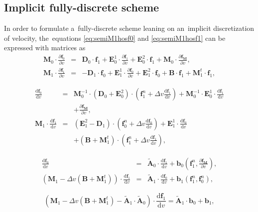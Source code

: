 \documentclass[review]{elsarticle}
\newcommand{\pdv}[2]{\frac{\partial{#1}}{\partial{#2}}}
\newcommand{\vect}[1]{\boldsymbol{#1}}
\newcommand{\matr}[1]{\mathbf{#1}}
\newcommand{\dI}{\text{d}}
\newcommand{\odv}[2]{\frac{\dI #1}{\dI #2}}
\newcommand{\ddv}[2]{\odv{#1}{#2}}
\newcommand{\vmag}{v}
\newcommand{\fM}{f_M}
\newcommand{\vfzero}{\vect{f}_0}
\newcommand{\fone}{\vect{f}_1}
\begin{document}
\subsection{Implicit fully-discrete scheme}\label{sec:impl_fullydiscrete_scheme}
In order to formulate a~fully-discrete scheme leaning on an~implicit 
discretization of velocity, the~equations \eqref{eq:semiM1hosf0} and 
\eqref{eq:semiM1hosf1} can be expressed with matrices as
\begin{eqnarray}
  \matr{M}_0 \cdot \pdv{\vfzero}{\vmag}  
  &=& 
  \matr{D}_0 \cdot \fone
  + \matr{E}_0^1 \cdot \pdv{\fone}{\vmag} + \matr{E}_0^2 \cdot \fone
  + \matr{M}_0 \cdot \pdv{\vect{\fM}}{\vmag} ,  
  \nonumber\\
  \matr{M}_1 \cdot \pdv{\fone}{\vmag}  
  &=& 
  - \matr{D}_1 \cdot \vfzero 
  + \matr{E}_1^1 \cdot \pdv{\vfzero}{\vmag}
  + \matr{E}_1^2 \cdot \vfzero
  + \matr{B} \cdot \fone
  + \matr{M}^t_1 \cdot \fone ,
  \nonumber
\end{eqnarray}

\begin{eqnarray}
  \ddv{\vfzero}{\vmag}  
  &=& 
  \matr{M}_0^{-1} \cdot \left(\matr{D}_0 + \matr{E}_0^2 \right) 
  \cdot \left(\fone^n + \Delta \vmag \ddv{\fone}{\vmag} \right)
  + \matr{M}_0^{-1} \cdot \matr{E}_0^1 \cdot \ddv{\fone}{\vmag} \nonumber\\
  && + \pdv{\vect{\fM}}{\vmag} ,  
  \nonumber\\
  \matr{M}_1 \cdot \ddv{\fone}{\vmag}  
  &=& 
  \left( \matr{E}_1^2 - \matr{D}_1 \right) 
  \cdot \left(\vfzero^n + \Delta\vmag \ddv{\vfzero}{\vmag} \right) 
  + \matr{E}_1^1 \cdot \ddv{\vfzero}{\vmag} \nonumber\\
  && + \left( \matr{B} + \matr{M}^t_1 \right)  
  \cdot \left(\fone^n + \Delta \vmag \ddv{\fone}{\vmag} \right) ,
  \nonumber
\end{eqnarray}

\begin{eqnarray}
  \ddv{\vfzero}{\vmag}  
  &=& 
  \matr{\tilde{A}}_0 \cdot \ddv{\fone}{\vmag}
  + \vect{b}_0\left(\fone^n, \pdv{\vect{\fM}}{\vmag}\right) ,  
  \label{eq:df0dv} \\
  \left( \matr{M}_1 
  - \Delta \vmag \left( \matr{B} + \matr{M}^t_1 \right) \right) 
  \cdot \ddv{\fone}{\vmag}  
  &=& 
  \matr{\tilde{A}}_1 \cdot \ddv{\vfzero}{\vmag}  
  + \vect{b}_1 \left( \fone^n, \vfzero^n \right) , 
  \label{eq:df1dvdf0dv}
\end{eqnarray}

\begin{equation}
  \left( \matr{M}_1 
  - \Delta \vmag \left( \matr{B} + \matr{M}^t_1 \right) 
  - \matr{\tilde{A}}_1 \cdot \matr{\tilde{A}}_0 \right) 
  \cdot \ddv{\fone}{\vmag}  
  = 
  \matr{\tilde{A}}_1 
  \cdot \vect{b}_0 + \vect{b}_1 , 
  \label{eq:df1dv}
\end{equation}
\end{document}
